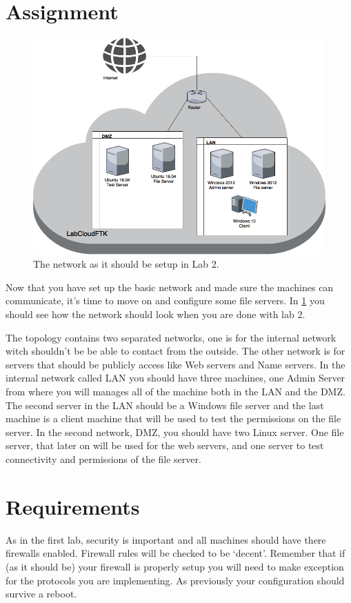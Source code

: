 \documentclass[paper=a4, fontsize=11pt]{report} %
\begin{document}
\section{Assignment}
\begin{figure}[h]
\centering
\includegraphics[width=1\linewidth]{./Lab02-Network}
\caption[Figure over network in Lab 2]{The network as it should be setup in Lab 2.}
\label{fig:network}
\end{figure}
Now that you have set up the basic network and made sure the machines can communicate, it's time to move on and configure some file servers. In \figurename \ref{fig:network} you should see how the network should look when you are done with lab 2.

The topology contains two separated networks, one is for the internal network witch shouldn't be be able to contact from the outside. The other network is for servers that should be publicly access like Web servers and Name servers. In the internal network called LAN you should have three machines, one Admin Server from where you will manages all of the machine both in the LAN and the DMZ. The second server in the LAN should be a Windows file server and the last machine is a client machine that will be used to test the permissions on the file server. In the second network, DMZ, you should have two Linux server. One file server, that later on will be used for the web servers, and one server to test connectivity and permissions of the file server.

\pagebreak

\section{Requirements}
\label{tasks}
As in the first lab, security is important and all machines should have there firewalls enabled. Firewall rules will be checked to be ‘decent’. Remember that if (as it should be) your firewall is properly setup you will need to make exception for the protocols you are implementing.
As previously your configuration should survive a reboot.
\end{document}
